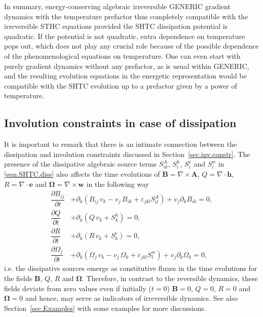 \documentclass[twoside]{article}
\newcommand{\AAA}{{\boldsymbol{A}}}
\newcommand{\ww}{{\boldsymbol{w}}}
\newcommand{\ee}{{\boldsymbol{e}}}
\newcommand{\hh}{{\boldsymbol{h}}}
\newcommand{\BB}{{\boldsymbol{B}}}
\newcommand{\pd}{\partial}
\newcommand{\eps}{\varepsilon}
\begin{document}
In summary, energy-conserving algebraic irreversible GENERIC gradient dynamics 
with the temperature prefactor thus completely compatible with the 
irreversible STHC equations provided the SHTC dissipation potential is 
quadratic. If the potential is not quadratic, extra dependence on temperature 
pops out, which does not play any crucial role because of the possible 
dependence of the phenomenological equations on temperature. One can even start 
with purely gradient dynamics without any prefactor, as is usual within 
GENERIC, and the resulting evolution equations in the energetic representation 
would be compatible with the SHTC evolution up to a prefactor given by a power 
of temperature.

\subsection{Involution constraints in case of dissipation}


It is important to remark that there is an intimate connection between 
the 
dissipation and involution constraints discussed in 
Section~\ref{sec.inv.constr}. The presence of the dissipative algebraic source 
terms $ S^A_{ik} $, $ S^h_i $, $ S^e_i $ and $ S^w_i $ in 
\eqref{eqn.SHTC.diss} also affects the time evolutions of $ 
\BB=\nabla\times\AAA 
$, $ Q=\nabla\cdot\hh $, $ R=\nabla\cdot\ee $ and $ \bm{\Omega}=\nabla\times\ww 
$ in the following way
\begin{subequations}\label{eqn.diss.invol.constr}
	\begin{align}
	\dfrac{\pd B_{ij}}{\pd t} & + \pd_k (B_{ij}\, v_k - v_j\, B_{ik} + 
	\eps_{jkl}S^A_{il})  + v_j \pd_k B_{ik} = 0,\label{eqn.diss.constr.B}\\[2mm]
	\dfrac{\pd Q}{\pd t} & + \pd_k (Q\,v_k + S^h_k)= 0, 
	\label{eqn.diss.constr.Q}\\[2mm]
	\dfrac{\pd R}{\pd t} & + \pd_k (R\,v_k + S^e_k) = 0, 
	\label{eqn.diss.constr.R}\\[2mm]
	\dfrac{\pd \Omega_j}{\pd t} & + \pd_k (\Omega_j\, v_k - v_j\, 
		\Omega_k + \eps_{jkl}S^w_l) + v_j \pd_k \Omega_k = 0, 
		\label{eqn.diss.constr.O}
	\end{align}
\end{subequations}
i.e. the dissipative sources emerge as constitutive fluxes in the time 
evolutions for the fields $ \BB $, $ Q $, $ R $ and $ \bm{\Omega}$. Therefore, 
in contrast to the reversible dynamics, these fields deviate from zero values 
even if 
initially ($ t = 0 $) $ \BB = 0  $, $ Q = 0 $, $ R = 0 $ and $ \bm{\Omega}=0$ 
and 
hence, may serve as indicators of irreversible dynamics. See also 
Section~\ref{sec.Examples} with some examples for more discussions.
\end{document}
